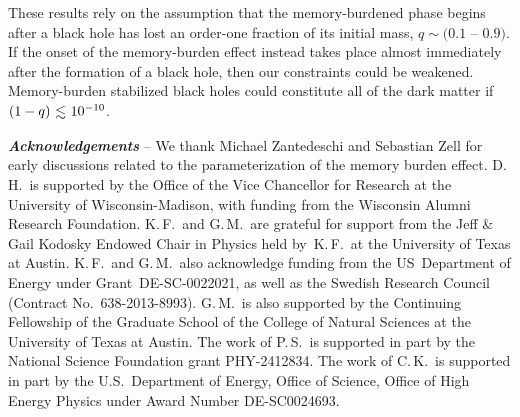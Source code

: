 \documentclass[aps, prl, reprint, preprintnumbers, showpacs, floatfix, nofootinbib, superscriptaddress, %
nofootinbib]{revtex4-1}
\newcommand{\lsim}{\raisebox{-0.13cm}{~\shortstack{$<$ \\[-0.07cm]
      $\sim$}}~}
\begin{document}
These results rely on the assumption that the memory-burdened phase begins after a black hole has lost an order-one fraction of its initial mass, $q \sim (0.1$ -- $0.9)$. If the onset of the memory-burden effect instead takes place almost immediately after the formation of a black hole, then our constraints could be weakened. Memory-burden stabilized black holes could constitute all of the dark matter if $(1-q) \lsim 10^{-10}$. 
\bigskip



\textit{\textbf{Acknowledgements}} -- We thank Michael Zantedeschi and Sebastian Zell for early discussions related to the parameterization of the memory burden effect. D.\,H.~is supported by the Office of the Vice Chancellor for Research at the University of Wisconsin-Madison, with funding from the Wisconsin Alumni Research Foundation. K.\,F.~and G.\,M.~are grateful for support from the Jeff \& Gail Kodosky Endowed Chair in Physics held by~K.\,F.~at the University of Texas at Austin. K.\,F.~and G.\,M.~also acknowledge funding from the US~Department of Energy under Grant~\mbox{DE-SC-0022021}, as well as the Swedish Research Council (Contract No.~638-2013-8993). G.\,M.~is also supported by the Continuing Fellowship of the Graduate School of the College of Natural Sciences at the University of Texas at Austin. The work of P.\,S.~is supported in part by the National Science Foundation grant PHY-2412834. The work of C.\,K.~is supported in part by the U.S.~Department of Energy, Office of Science, Office of High Energy Physics under Award Number DE-SC0024693.





\end{document}
